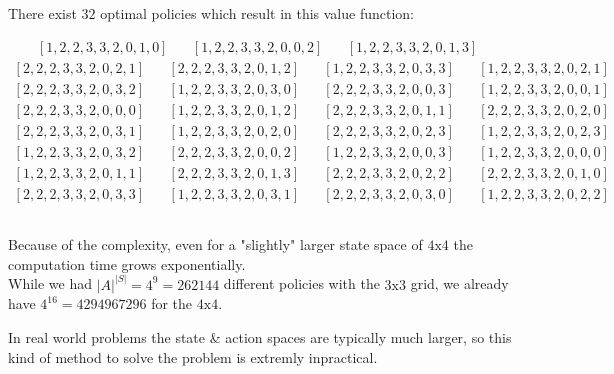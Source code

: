 \documentclass[11pt,a4paper]{article}
\begin{document}
\vspace{10pt}

There exist $32$ optimal policies which result in this value function:


\begin{align*}
[2, 2, 2, 3, 3, 2, 0, 0, 1]\;\;\;\;\;\;[1, 2, 2, 3, 3, 2, 0, 1, 0]\;\;\;\;\;\;[1, 2, 2, 3, 3, 2, 0, 0, 2]\;\;\;\;\;\;[1, 2, 2, 3, 3, 2, 0, 1, 3]\\
[2, 2, 2, 3, 3, 2, 0, 2, 1]\;\;\;\;\;\;[2, 2, 2, 3, 3, 2, 0, 1, 2]\;\;\;\;\;\;[1, 2, 2, 3, 3, 2, 0, 3, 3]\;\;\;\;\;\;[1, 2, 2, 3, 3, 2, 0, 2, 1]\\
[2, 2, 2, 3, 3, 2, 0, 3, 2]\;\;\;\;\;\;[1, 2, 2, 3, 3, 2, 0, 3, 0]\;\;\;\;\;\;[2, 2, 2, 3, 3, 2, 0, 0, 3]\;\;\;\;\;\;[1, 2, 2, 3, 3, 2, 0, 0, 1]\\
[2, 2, 2, 3, 3, 2, 0, 0, 0]\;\;\;\;\;\;[1, 2, 2, 3, 3, 2, 0, 1, 2]\;\;\;\;\;\;[2, 2, 2, 3, 3, 2, 0, 1, 1]\;\;\;\;\;\;[2, 2, 2, 3, 3, 2, 0, 2, 0]\\
[2, 2, 2, 3, 3, 2, 0, 3, 1]\;\;\;\;\;\;[1, 2, 2, 3, 3, 2, 0, 2, 0]\;\;\;\;\;\;[2, 2, 2, 3, 3, 2, 0, 2, 3]\;\;\;\;\;\;[1, 2, 2, 3, 3, 2, 0, 2, 3]\\
[1, 2, 2, 3, 3, 2, 0, 3, 2]\;\;\;\;\;\;[2, 2, 2, 3, 3, 2, 0, 0, 2]\;\;\;\;\;\;[1, 2, 2, 3, 3, 2, 0, 0, 3]\;\;\;\;\;\;[1, 2, 2, 3, 3, 2, 0, 0, 0]\\
[1, 2, 2, 3, 3, 2, 0, 1, 1]\;\;\;\;\;\;[2, 2, 2, 3, 3, 2, 0, 1, 3]\;\;\;\;\;\;[2, 2, 2, 3, 3, 2, 0, 2, 2]\;\;\;\;\;\;[2, 2, 2, 3, 3, 2, 0, 1, 0]\\
[2, 2, 2, 3, 3, 2, 0, 3, 3]\;\;\;\;\;\;[1, 2, 2, 3, 3, 2, 0, 3, 1]\;\;\;\;\;\;[2, 2, 2, 3, 3, 2, 0, 3, 0]\;\;\;\;\;\;[1, 2, 2, 3, 3, 2, 0, 2, 2]
\end{align*}

\subsection{}

Because of the complexity, even for a "slightly" larger state space of $4\text{x}4$ the computation time grows exponentially.\\
While we had $|A|^{|S|}=4^9=262144$ different policies with the $3\text{x}3$ grid, we already have $4^{16}=4294967296$ for the $4\text{x}4$.\\

\vspace{10pt}

In real world problems the state \& action spaces are typically much larger, so this kind of method to solve the problem
is extremly inpractical.~
\end{document}
